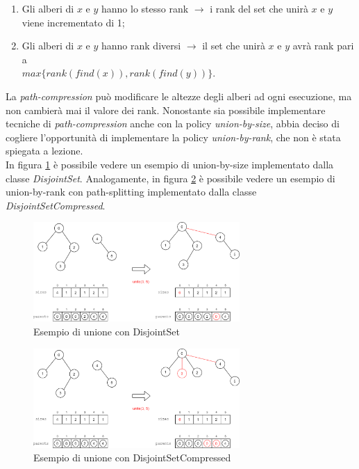 \begin{enumerate}
    \item Gli alberi di $x$ e $y$ hanno lo stesso rank $\rightarrow{}$ i rank del set che unirà $x$ e $y$ viene incrementato di 1;
    \item Gli alberi di $x$ e $y$ hanno rank diversi $\rightarrow{}$ il set che unirà $x$ e $y$ avrà rank pari a \\ $max\{ rank(find(x)), rank(find(y)) \}$.
\end{enumerate}

La \textit{path-compression} può modificare le altezze degli alberi ad ogni esecuzione, ma non cambierà mai il valore dei rank.
Nonostante sia possibile implementare tecniche di \textit{path-compression} anche con la policy \textit{union-by-size}, abbia deciso di cogliere l'opportunità di implementare la policy \textit{union-by-rank}, che non è stata spiegata a lezione. \\

In figura \ref{fig:disjoint-set-union-example} è possibile vedere un esempio di union-by-size implementato dalla classe \textit{DisjointSet}. Analogamente, in figura \ref{fig:disjoint-set-compressed-union-example} è possibile vedere un esempio di union-by-rank con path-splitting implementato dalla classe \textit{DisjointSetCompressed}.

\begin{figure}[h]
	\centering
	\includegraphics[width=0.7\textwidth]{./images/DisjointSetExample.png}
	\caption{Esempio di unione con DisjointSet}
	\label{fig:disjoint-set-union-example}
\end{figure}

\begin{figure}[h]
	\centering
	\includegraphics[width=0.7\textwidth]{./images/DisjointSetCompressedExample.png}
	\caption{Esempio di unione con DisjointSetCompressed}
	\label{fig:disjoint-set-compressed-union-example}
\end{figure}